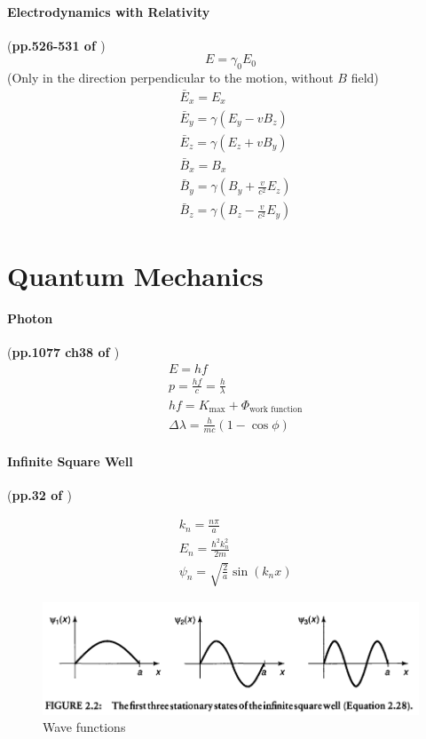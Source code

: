 \documentclass{article}
\numberwithin{equation}{subsection} %
\theoremstyle{definition}
\begin{document}
\paragraph{Electrodynamics with Relativity} (\textbf{pp.526-531 of
\cite{Griffiths_electrod}})
\begin{equation}
    E = \gamma_0 E_0
\end{equation}
    (Only in the direction perpendicular to
    the motion, without $B$ field)
\begin{align}
    & \bar{E}_x = E_x \\
    & \bar{E}_y = \gamma(E_y - v B_z) \\
    & \bar{E}_z = \gamma(E_z + v B_y) \\
    & \bar{B}_x = B_x \\
    & \bar{B}_y = \gamma(B_y + \frac{v}{c^2} E_z) \\
    & \bar{B}_z = \gamma(B_z - \frac{v}{c^2} E_y)
\end{align}

\section{Quantum Mechanics}
\label{sec:Quantum-Mechanics}

\paragraph{Photon} (\textbf{pp.1077 ch38 of \cite{book}})
\begin{align}
    & E = h f \\
    & p= \frac{hf}{c} = \frac{h}{\lambda} \\
    & hf = K_\text{max} + \Phi_\text{work function} \\
    & \Delta\lambda = \frac{h}{mc}(1-\cos{\phi})
\end{align}

\paragraph{Infinite Square Well} (\textbf{pp.32 of \cite{Griffiths_QM}})

\begin{align}
    & k_n = \frac{n\pi}{a} \\
    & E_n = \frac{\hbar^2 k_n^2}{2m} \\
    & \psi_n = \sqrt{\frac{2}{a}} \sin(k_n x)
\end{align}
\begin{figure}[H]
    \centering
    \includegraphics[width=0.8\linewidth]{pics/qm_infinite_square_well.PNG}
    \caption{Wave functions}
\end{figure}
\end{document}
